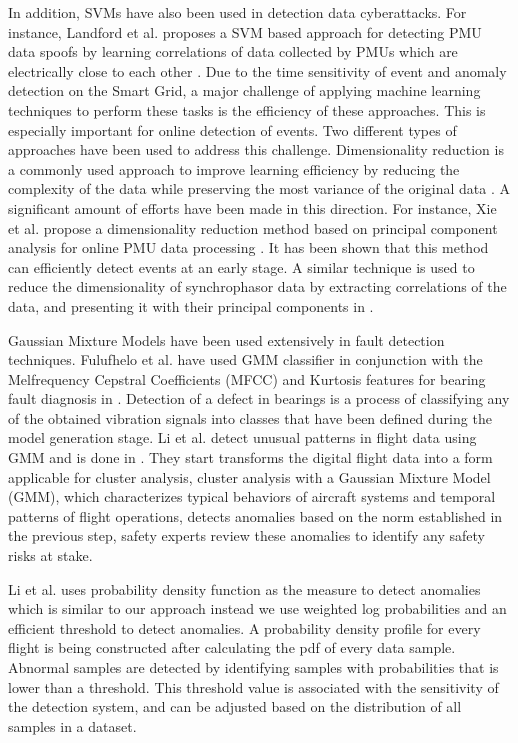 In addition, SVMs have also been used in detection data cyberattacks. For instance, Landford et al. proposes a SVM based approach for detecting PMU data spoofs by learning correlations of data collected by PMUs which are electrically close to each other \cite{landford2015fast}. Due to the time sensitivity of event and anomaly detection on the Smart Grid, a major challenge of applying machine learning techniques to perform these tasks is the efficiency of these approaches. This is especially important for online detection of events. Two different types of approaches have been used to address this challenge. Dimensionality reduction is a commonly used approach to improve learning efficiency by reducing the complexity of the data while preserving the most variance of the original data \cite{van2009dimensionality}. A significant amount of efforts have been made in this direction. For instance, Xie et al. propose a dimensionality reduction method based on principal component analysis for online PMU data processing \cite{xie2014dimensionality}. It has been shown that this method can efficiently detect events at an early stage. A similar technique is used to reduce the dimensionality of synchrophasor data by extracting correlations of the data, and presenting it with their principal components in \cite{dahal2012online}. 

Gaussian Mixture Models have been used extensively in fault detection techniques. Fulufhelo et al. have used GMM classifier in conjunction with the Melfrequency Cepstral Coefficients (MFCC) and Kurtosis features for bearing fault diagnosis in \cite{nelwamondo2006faults}. Detection of a defect in bearings is a process of classifying any of the obtained vibration signals into classes that have been defined during the model generation stage. Li et al. detect unusual patterns in flight data using GMM and is done in \cite{li2016anomaly}. They start transforms the digital flight data into a form applicable for cluster analysis, cluster analysis with a Gaussian Mixture Model (GMM), which characterizes typical behaviors of aircraft systems and temporal patterns of flight operations, detects anomalies based on the norm established in the previous step, safety experts review these anomalies to identify any safety risks at stake.

Li et al. uses probability density function as the measure to detect anomalies which is similar to our approach instead we use weighted log probabilities and an efficient threshold to detect anomalies. A probability density profile for every flight is being constructed after calculating the pdf of every data sample. Abnormal samples are detected by identifying samples with probabilities that is lower than a threshold. This threshold value is associated with the sensitivity of the detection system, and can be adjusted based on the distribution of all samples in a dataset.

